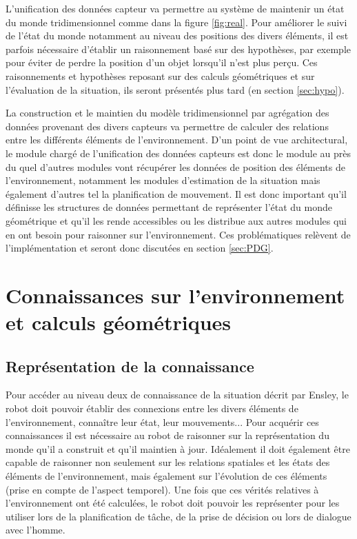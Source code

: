 \documentclass[a4paper,11pt,twoside]{StyleThese}
\begin{document}
L'unification des données capteur va permettre au système de maintenir un état du monde tridimensionnel comme dans la figure \ref{fig:real}. Pour améliorer le suivi de l'état du monde notamment au niveau des positions des divers éléments, il est parfois nécessaire d'établir un raisonnement basé sur des hypothèses, par exemple pour éviter de perdre la position d'un objet lorsqu'il n'est plus perçu. Ces raisonnements et hypothèses reposant sur des calculs géométriques et sur l'évaluation de la situation, ils seront présentés plus tard (en section \ref{sec:hypo}). 

La construction et le maintien du modèle tridimensionnel par agrégation des données provenant des divers capteurs va permettre de calculer des relations entre les différents éléments de l'environnement.
D'un point de vue architectural, le module chargé de l'unification des données capteurs est donc le module au près du quel d'autres modules vont récupérer les données de position des éléments de l'environnement, notamment les modules d'estimation de la situation mais également d'autres tel la planification de mouvement. Il est donc important qu'il définisse les structures de données permettant de représenter l'état du monde géométrique et qu'il les rende accessibles ou les distribue aux autres modules qui en ont besoin pour raisonner sur l'environnement. Ces problématiques relèvent de l'implémentation et seront donc discutées en section \ref{sec:PDG}.


\section{Connaissances sur l'environnement et calculs géométriques}
\label{sec:calculs}
\subsection{Représentation de la connaissance}
\label{sec:facts}

Pour accéder au niveau deux de connaissance de la situation décrit par Ensley, le robot doit pouvoir établir des connexions entre les divers éléments de l'environnement, connaître leur état, leur mouvements... Pour acquérir ces connaissances il est nécessaire au robot de raisonner sur la représentation du monde qu'il a construit et qu'il maintien à jour. Idéalement il doit également être capable de raisonner non seulement sur les relations spatiales et les états des éléments de l'environnement, mais également sur l'évolution de ces éléments (prise en compte de l'aspect temporel). Une fois que ces vérités relatives à l'environnement ont été calculées, le robot doit pouvoir les représenter pour les utiliser lors de la planification de tâche, de la prise de décision ou lors de dialogue avec l'homme.
\end{document}

